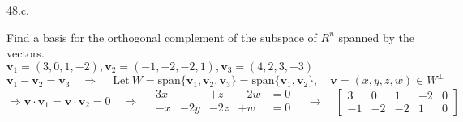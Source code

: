 \documentclass[12pt]{book}
\begin{document}
\begin{CJK}{UTF8}{bsmi}
48.c. \begin{minipage}[t]{\dimexpr\linewidth}
Find a basis for the orthogonal complement of the subspace of $R^n$ spanned by the vectors. \\
$\textbf{v}_1=(3,0,1,-2),\textbf{v}_2=(-1,-2,-2,1),\textbf{v}_3=(4,2,3,-3)$ \\
$\textbf{v}_1-\textbf{v}_2=\textbf{v}_3\quad\Rightarrow\quad\mathrm{\ Let\ }W=\mathrm{span}\{\textbf{v}_1,\textbf{v}_2,\textbf{v}_3\}=\mathrm{span}\{\textbf{v}_1,\textbf{v}_2\},\quad\textbf{v}=(x,y,z,w)\in W^\perp$ \\
$\Rightarrow\textbf{v}\cdot\textbf{v}_1=\textbf{v}\cdot\textbf{v}_2=0\quad\Rightarrow\quad\begin{matrix}
3x & & +z & -2w & =0 \\
-x & -2y & -2z & +w & =0
\end{matrix}\quad\rightarrow\quad\begin{bmatrix}
3  & 0  & 1  & -2 & 0 \\
-1 & -2 & -2 & 1  & 0
\end{bmatrix}$ \\
\end{minipage}

\end{CJK}
\end{document}
